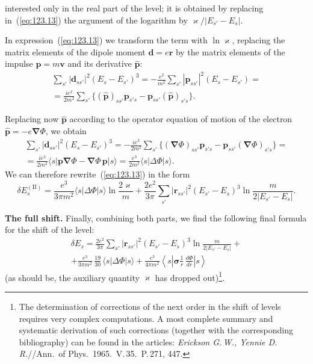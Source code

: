 
\noindent interested only in the real part of the level; it is obtained by replacing in~(\ref{eq:123.13}) the argument of the logarithm by $\varkappa/|E_{s'} - E_s|$.

In expression~(\ref{eq:123.13}) we transform the term with $\ln\varkappa$, replacing the matrix elements of the dipole moment $\mathbf{d} = e\mathbf{r}$ by the matrix elements of the impulse $\mathbf{p} = m\mathbf{v}$ and its derivative $\hat{\mathbf{p}}$:
\begin{multline*}
\sum_{s'}|\mathbf{d}_{ss'}|^2(E_s - E_{s'})^3 = -\frac{e^2}{m^2}\sum_{s'}|\mathbf{p}_{ss'}|^2(E_s - E_{s'}) = {} \\
= \frac{ie^2}{2m^2}\sum_{s'}\bigl\{(\hat{\mathbf{p}})_{ss'}\mathbf{p}_{s's} - \mathbf{p}_{ss'}(\hat{\mathbf{p}})_{s's}\bigr\}.
\end{multline*}

Replacing now $\hat{\mathbf{p}}$ according to the operator equation of motion of the electron $\hat{\mathbf{p}} = -e\boldsymbol{\nabla}\Phi$, we obtain
\begin{multline}
\sum_{s'}|\mathbf{d}_{ss'}|^2(E_s - E_{s'})^3 = -\frac{ie^3}{2m^2}\sum_{s'}\bigl\{(\boldsymbol{\nabla}\Phi)_{ss'}\mathbf{p}_{s's} - \mathbf{p}_{ss'}(\boldsymbol{\nabla}\Phi)_{s's}\bigr\} = {} \\
= \frac{ie^3}{2m^2}\langle s|\mathbf{p}\boldsymbol{\nabla}\Phi - \boldsymbol{\nabla}\Phi\,\mathbf{p}|s\rangle = \frac{e^3}{2m^2}\langle s|\Delta\Phi|s\rangle.
\label{eq:123.14}
\end{multline}
We can therefore rewrite~(\ref{eq:123.13}) in the form
\begin{equation}
\delta E_s^{(\mathrm{II})} = \frac{e^3}{3\pi m^2}\langle s|\Delta\Phi|s\rangle\ln\frac{2\varkappa}{m} + \frac{2e^2}{3\pi}\sum_{s'}|\mathbf{r}_{ss'}|^2(E_{s'} - E_s)^3\ln\frac{m}{2|E_{s'} - E_s|}.
\label{eq:123.15}
\end{equation}

\textbf{The full shift.} Finally, combining both parts, we find the following final formula for the shift of the level:
\begin{multline}
\delta E_s = \frac{2e^2}{3\pi}\sum_{s'}|\mathbf{r}_{ss'}|^2(E_{s'} - E_s)^3\ln\frac{m}{2|E_{s'} - E_s|} + {} \\
+ \frac{e^3}{3\pi m^2}\,\frac{19}{30}\,\langle s|\Delta\Phi|s\rangle + \frac{e^3}{4\pi m^2}\left\langle s\left|\boldsymbol{\sigma}\frac{1}{r}\,\frac{d\Phi}{dr}\right|s\right\rangle
\label{eq:123.16}
\end{multline}
(as should be, the auxiliary quantity $\varkappa$ has dropped out)\footnote{The determination of corrections of the next order in the shift of levels requires very complex computations. A most complete summary and systematic derivation of such corrections (together with the corresponding bibliography) can be found in the articles: \emph{Erickson G.\,W., Yennie D.\,R.}//Ann.\ of Phys.\ 1965.\ V.\,35.\ P.\,271, 447.}.

